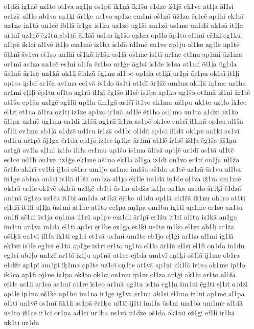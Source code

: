 {e1dži
ig1nē
uz1te
ot1va
ag1ļu
os1pā
īk1ņā
īk1šu
e1dze
iš1jā
ek1ve
at1ļa
āl1si
or1zā
ul1lo
ab1va
aņ1ķi
ār1ķe
ur1vo
ap1ze
em1ni
oš1ņā
ūž1za
ēr1cē
ap1hi
ek1nī
uz1ņe
in1tā
un1cē
ib1lā
īr1ga
is1ku
uz1zo
ug1ši
am1zā
as1me
un1dā
ak1sā
it1ļa
ur1nī
uz1ņē
ēz1tu
ab1tā
ār1šā
us1sa
īg1šo
eņ1ca
op1lo
āp1to
el1mī
eč1zi
eg1ku
al1pē
ik1rī
al1vē
it1ļo
em1mē
iz1ba
is1dā
īd1mē
en1ve
ap1ju
ol1ko
ag1le
ap1tē
āt1nī
āv1va
et1so
an1hi
eš1kā
ir1šu
es1lā
os1me
is1tī
ur1ne
et1nu
ap1mi
ūz1ma
or1mī
as1za
an1cē
es1ni
al1fa
ēr1bo
ur1ģe
āg1si
is1de
īs1sa
at1mi
ēš1ļa
ūg1da
ūs1nā
ār1ra
un1kā
ok1li
ē1dzū
ēg1nu
al1bo
op1da
et1ķī
ur1pi
ār1pu
ok1sī
it1ļi
ap1sa
ip1ci
ar1ša
av1ma
ec1vā
iv1do
ūs1ti
at1dī
ār1žē
am1na
ak1ļā
iņ1me
uz1ha
ar1mi
eļ1ļi
ēp1tu
of1to
ag1rā
il1zī
ēg1šo
il1sē
is1ba
ap1ko
ug1šo
ot1mā
iž1ni
ār1tē
at1šu
ep1šu
uz1ģē
ag1lū
up1lu
ām1gā
ar1šī
it1ve
ak1ma
už1pu
uk1te
uz1lo
ik1ce
eļ1rī
et1na
āl1ra
oz1ti
iz1ze
ap1zo
ir1nā
ad1le
ēt1ho
ad1mo
un1ta
a1dzi
az1ko
āl1pa
uz1nē
ug1ma
en1di
iz1šū
ag1rū
īr1ra
as1pē
ok1ce
en1cī
il1mā
op1su
al1šu
of1li
ev1ma
ab1ļā
a1dzē
ud1ru
ir1zā
od1bi
ol1dā
ap1ci
il1dā
ok1pe
an1ki
as1vī
od1ru
ur1pā
āj1ga
ēr1da
ep1ju
iz1re
iņ1ka
ār1mī
at1lē
ir1sē
iš1ļa
ēg1ša
āš1ņu
ar1gā
av1la
aļ1ni
iz1fo
il1la
er1mu
up1šo
is1ma
āl1sā
ap1ļē
ur1dī
as1tā
ul1tē
es1cē
ud1lī
on1ve
uz1ģe
ek1me
āš1ņo
ek1la
āl1ga
iz1di
on1vo
er1tī
on1ja
uļ1žo
ār1fo
ak1rī
ev1bi
ij1ci
eš1ra
um1jo
az1me
im1šu
aš1da
or1tē
uz1rā
ār1vu
al1ba
in1ge
ab1na
an1ci
īs1lā
il1šā
am1za
al1jo
ek1le
im1dā
iņ1de
oļ1va
iž1ra
am1mē
ok1rā
er1le
ok1vē
ok1rū
uz1ķē
eb1ti
āv1la
a1dža
iz1ļu
on1ka
uz1do
ār1ķī
ē1dzā
an1nā
āģ1zo
uz1ča
īt1bi
am1da
at1kā
ēj1ko
ul1du
op1lā
uk1šā
ik1nu
oh1ro
at1ti
eļ1dā
it1li
uļ1ļa
ūs1mi
at1he
at1to
ec1pa
aņ1pa
om1bu
ig1tī
ap1me
er1so
an1tu
on1fi
aš1ni
īv1ja
oņ1ma
il1rū
ap1pe
em1di
ār1pī
er1žu
it1rī
al1tu
iz1kā
an1gu
im1tu
an1va
īn1dā
el1ti
ap1sī
ēr1be
ez1ga
ēt1ki
us1tē
īn1ko
el1ze
ab1lī
ar1tā
aš1ķū
en1vi
il1fa
ik1ti
eg1ri
et1vā
us1mi
um1te
eb1jo
eļ1ģi
ar1ha
al1mi
ig1lā
ek1vē
is1le
eg1rē
el1tā
ap1ģe
iz1ri
er1to
ug1to
el1lo
ār1lū
el1sī
el1fī
oņ1da
in1du
eg1si
ub1ļo
un1zē
ar1bī
iz1ju
ap1nā
at1ce
ej1da
am1vī
eņ1ķi
oš1ļā
ij1me
ob1ra
e1dže
ap1pī
am1pi
īķ1ma
op1te
uz1cī
oņ1te
at1vā
ap1ņi
uk1lā
ir1so
ak1me
ip1lo
ik1ca
ap1fi
oj1ne
iz1pa
ok1to
ok1ci
en1mu
ip1nī
ol1za
ār1ģi
āk1ļu
ēr1to
āl1šā
ef1le
as1li
ar1so
as1mī
at1re
īs1co
ar1nā
ug1ta
is1ta
eg1ļu
ām1ni
ēg1ti
eļ1ri
o1dzi
op1lē
ip1nā
oš1ķē
ap1bū
im1nā
ir1gē
īg1vā
ēr1nu
āk1si
el1mo
iz1ņi
ap1mē
al1pa
ol1ti
un1vē
os1mī
āk1li
as1pā
ēr1ķu
ul1tī
ij1ti
im1fa
ūs1ni
um1ba
um1me
al1dā
us1to
iž1ce
it1cī
or1ņa
ad1rī
ur1ba
us1vā
u1dze
oš1da
ok1mī
ež1ģi
ef1li
ir1kā
uk1ti
uz1dā
}
